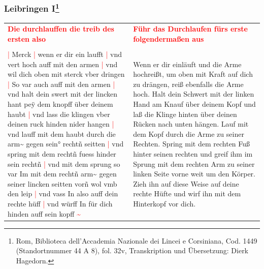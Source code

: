 \subsubsection[Leibringen I]{
    Leibringen I\footnote{
        \hspace*{0.5ex}Rom, Biblioteca dell'Accademia Nazionale dei Lincei e Corsiniana,
        Cod. 1449 (Standortnummer 44 A 8), fol. 32v, Transkription und Übersetzung: Dierk Hagedorn.}}

\begin{longtable}{p{6.25cm}p{6.25cm}}
    \textbf{\textcolor{red}{
        Die durchlauffen die treib des ersten also}}
    &
    \textbf{\textcolor{red}{
        Führ das Durchlaufen fürs erste folgendermaßen aus}}
    \\
    \\
    \textcolor{red}{|} Merck
    \textcolor{red}{|} wenn er dir ein laufft
    \textcolor{red}{|} vnd vert hoch auff mit den armen
    \textcolor{red}{|} vnd wil dich oben mit sterck vber dringen
    \textcolor{red}{|} So var auch auff mit den armen
    \textcolor{red}{|} vnd halt dein swert mit der lincken hant peÿ dem knopff über deinem haubt
    \textcolor{red}{|} vnd lass die klingen vber deinen ruck hinden nider hangen
    \textcolor{red}{|} vnd lauff mit dem haubt durch die arm\textasciitilde{} gegen sein° rechtñ seitten
    \textcolor{red}{|} vnd spring mit dem rechtñ fuess hinder sein rechtñ
    \textcolor{red}{|} vnd mit dem sprung so var Im mit dem rechtñ arm\textasciitilde{} gegen seiner lincken seitten vorñ wol vmb den leip
    \textcolor{red}{|} vnd vass In also auff dein rechte hüff
    \textcolor{red}{|} vnd würff In für dich hinden auff sein kopff \textcolor{red}{\textasciitilde{}}
    &
    Wenn er dir einläuft und die Arme hochreißt, um oben mit Kraft auf dich zu drängen, reiß ebenfalls die Arme hoch.
    Halt dein Schwert mit der linken Hand am Knauf über deinem Kopf und laß die Klinge hinten über deinen Rücken nach unten hängen.
    Lauf mit dem Kopf durch die Arme zu seiner Rechten.
    Spring mit dem rechten Fuß hinter seinen rechten und greif ihm im Sprung mit dem rechten Arm zu seiner linken Seite vorne weit um den Körper.
    Zieh ihn auf diese Weise auf deine rechte Hüfte und wirf ihn mit dem Hinterkopf vor dich.
\end{longtable}

\newpage

\begin{center}
\end{center}

